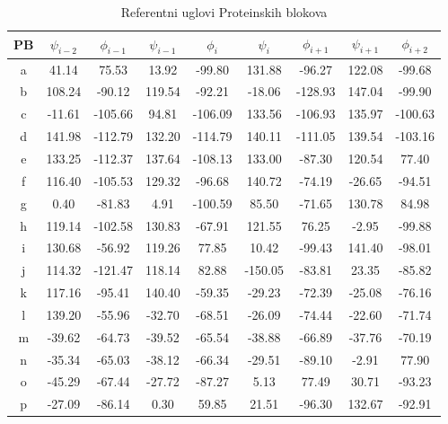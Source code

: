 \documentclass[a4paper,12pt]{article}
\begin{document}
\begin{table}[h!]
    \centering
    \begin{tabular}{|c|c|c|c|c|c|c|c|c|}
        \hline
        \textbf{PB} & \textbf{$\psi_{i-2}$} & \textbf{$\phi_{i-1}$} & \textbf{$\psi_{i-1}$} & \textbf{$\phi_i$} & \textbf{$\psi_i$} & \textbf{$\phi_{i+1}$} & \textbf{$\psi_{i+1}$} & \textbf{$\phi_{i+2}$ } \\
        \hline
        a & 41.14 & 75.53 & 13.92 & -99.80 & 131.88 & -96.27 & 122.08 & -99.68 \\ \hline
        b & 108.24 & -90.12 & 119.54 & -92.21 & -18.06 & -128.93 & 147.04 & -99.90 \\ \hline
        c & -11.61 & -105.66 & 94.81 & -106.09 & 133.56 & -106.93 & 135.97 & -100.63 \\ \hline
        d & 141.98 & -112.79 & 132.20 & -114.79 & 140.11 & -111.05 & 139.54 & -103.16 \\ \hline
        e & 133.25 & -112.37 & 137.64 & -108.13 & 133.00 & -87.30 & 120.54 & 77.40 \\ \hline
        f & 116.40 & -105.53 & 129.32 & -96.68 & 140.72 & -74.19 & -26.65 & -94.51 \\ \hline
        g & 0.40   & -81.83 & 4.91 & -100.59 & 85.50 & -71.65 & 130.78 & 84.98 \\ \hline
        h & 119.14 & -102.58 & 130.83 & -67.91 & 121.55 & 76.25 & -2.95 & -99.88 \\ \hline
        i & 130.68 & -56.92 & 119.26 & 77.85 & 10.42 & -99.43 & 141.40 & -98.01 \\ \hline
        j & 114.32 & -121.47 & 118.14 & 82.88 & -150.05 & -83.81 & 23.35 & -85.82 \\ \hline
        k & 117.16 & -95.41 & 140.40 & -59.35 & -29.23 & -72.39 & -25.08 & -76.16 \\ \hline
        l & 139.20 & -55.96 & -32.70 & -68.51 & -26.09 & -74.44 & -22.60 & -71.74 \\ \hline
        m & -39.62 & -64.73 & -39.52 & -65.54 & -38.88 & -66.89 & -37.76 & -70.19 \\ \hline
        n & -35.34 & -65.03 & -38.12 & -66.34 & -29.51 & -89.10 & -2.91 & 77.90 \\ \hline
        o & -45.29 & -67.44 & -27.72 & -87.27 & 5.13 & 77.49 & 30.71 & -93.23 \\ \hline
        p & -27.09 & -86.14 & 0.30 & 59.85 & 21.51 & -96.30 & 132.67 & -92.91 \\ \hline
    \end{tabular}
	\caption{Referentni uglovi Proteinskih blokova}
	\label{Tabela:1}
\end{table}
\end{document}
